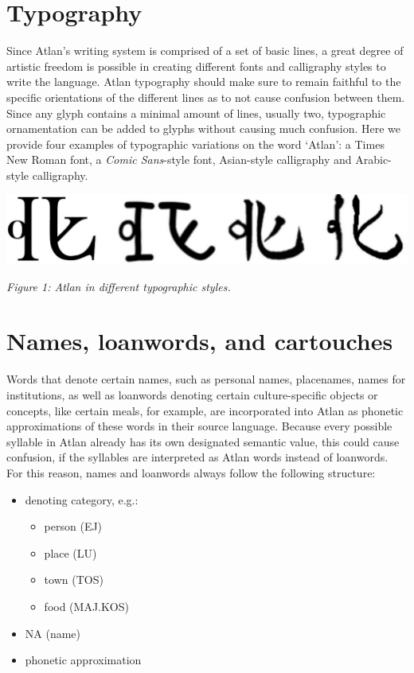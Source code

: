 \section{Typography}



\noindent Since Atlan’s writing system is comprised of a set of basic lines, a great degree of artistic freedom is possible in creating different fonts and calligraphy styles to write the language. Atlan typography should make sure to remain faithful to the specific orientations of the different lines as to not cause confusion between them. Since any glyph contains a minimal amount of lines, usually two, typographic ornamentation can be added to glyphs without causing much confusion. Here we provide four examples of typographic variations on the word ‘Atlan’: a Times New Roman font, a {\it Comic Sans}-style font, Asian-style calligraphy and Arabic-style calligraphy.


\begin{cent\idx{scent}er}
\includegraphics[scale=0.15]{./Images/Atlogos.jpeg}

{\footnotesize \it Figure 1: Atlan in different typographic styles.}
\end{cent\idx{scent}er}
\section{Names, loanwords, and cartouches}

Words that denote certain names, such as personal names, placenames, names for institutions, as well as loanwords denoting certain culture-specific objects or concepts, like certain meals, for example, are incorporated into Atlan as phonetic approximations of these words in their source language. Because every possible syllable in Atlan already has its own designated semantic value, this could cause confusion, if the syllables are interpreted as Atlan words instead of loanwords. For this reason, names and loanwords always follow the following structure: 

\begin{itemize}
	\item denoting category, e.g.: 
		\begin{itemize}
			\item[] person \ej (EJ)
			\item[] place \lu (LU)
			\item[] town \tos (TOS)
			\item[] food \maj \kos (MAJ.KOS)
		\end{itemize}
	\item NA \na (name)
	\item phonetic approximation  

\end{itemize}

